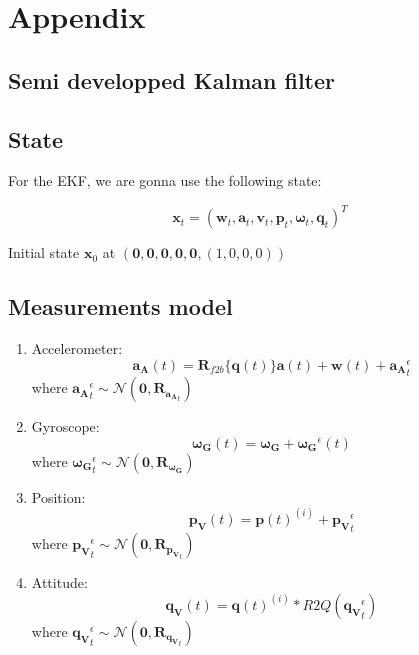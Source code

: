 \documentclass[]{article}
\providecommand{\tightlist}{%
  \setlength{\itemsep}{0pt}\setlength{\parskip}{0pt}}
\begin{document}
\section{Appendix}\label{appendix}

\subsection{Semi developped Kalman
filter}\label{semi-developped-kalman-filter}

\subsection{State}\label{state-2}

For the EKF, we are gonna use the following state:

\[\mathbf{x}_t = (\mathbf{w}_t, \mathbf{a}_t, \mathbf{v}_t, \mathbf{p}_t, \boldsymbol{\omega}_t, \mathbf{q}_t)^T\]

Initial state \(\mathbf{x}_0\) at
\((\mathbf{0}, \mathbf{0}, \mathbf{0}, \mathbf{0}, \mathbf{0}, (1, 0, 0, 0))\)

\hypertarget{measurements-model}{\subsection{Measurements
model}\label{measurements-model}}

\begin{enumerate}
\def\labelenumi{\arabic{enumi}.}
\tightlist
\item
  Accelerometer:
  \[\mathbf{a_A}(t) = \mathbf{R}_{f2b}\{\mathbf{q}(t)\}\mathbf{a}(t) + \mathbf{w}(t) + \mathbf{a_A}^\epsilon_t\]
  where
  \(\mathbf{a_A}^\epsilon_t \sim \mathcal{N}(\mathbf{0}, \mathbf{R}_{\mathbf{a_A}_t })\)
\item
  Gyroscope:
  \[\mathbf{\boldsymbol{\omega}_G}(t) = \mathbf{\boldsymbol{\omega}_G} + \mathbf{\boldsymbol{\omega}_G}^\epsilon(t)\]
  where
  \(\mathbf{\boldsymbol{\omega}_G}^\epsilon_t \sim \mathcal{N}(\mathbf{0}, \mathbf{R}_{\mathbf{\boldsymbol{\omega}_G}})\)
\item
  Position:
  \[\mathbf{p_V}(t) = \mathbf{p}(t)^{(i)} + \mathbf{p_V}^\epsilon_t\]
  where
  \(\mathbf{p_V}^\epsilon_t \sim \mathcal{N}(\mathbf{0}, \mathbf{R}_{\mathbf{p_V}_t })\)
\item
  Attitude:
  \[\mathbf{q_V}(t) = \mathbf{q}(t)^{(i)}*R2Q(\mathbf{q_V}^\epsilon_t)\]
  where
  \(\mathbf{q_V}^\epsilon_t \sim \mathcal{N}(\mathbf{0}, \mathbf{R}_{\mathbf{q_V}_t })\)
\end{enumerate}
\end{document}
